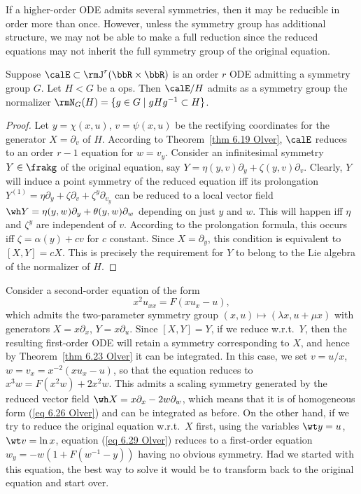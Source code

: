 If a higher-order ODE admits several symmetries, then it may be reducible in order more than once. However, unless the symmetry group has additional structure, we may not be able to make a full reduction since the reduced equations may not inherit the full symmetry group of the original equation.

\begin{thm}\label{thm 6.23 Olver}
    Suppose $\calE\subset\rmJ^r(\bbR\times\bbR)$ is an order $r$ ODE admitting a symmetry group $G$. Let $H<G$ be a \gls{ops}. Then $\calE\slash H$ admits as a symmetry group the normalizer $\rmN_G(H)=\{g\in G\mid gHg^{-1}\subset H\}$.
\end{thm}
\begin{proof}
    Let $y=\chi(x,u)$, $v=\psi(x,u)$ be the rectifying coordinates for the generator $X=\partial_v$ of $H$. According to Theorem~\ref{thm 6.19 Olver}, $\calE$ reduces to an order $r-1$ equation for $w=v_y$. Consider an infinitesimal symmetry $Y\in\frakg$ of the original equation, say $Y=\eta(y,v)\partial_y+\zeta(y,v)\partial_v$. Clearly, $Y$ will induce a point symmetry of the reduced equation iff its prolongation $Y^{(1)}=\eta\partial_y+\zeta\partial_v+\zeta^y\partial_{v_y}$ can be reduced to a local vector field $\wh Y=\eta(y,w)\partial_y+\theta(y,w)\partial_w$ depending on just $y$ and $w$. This will happen iff $\eta$ and $\zeta^y$ are independent of $v$. According to the prolongation formula, this occurs iff $\zeta=\alpha(y)+cv$ for $c$ constant. Since $X=\partial_y$, this condition is equivalent to $[X,Y]=cX$. This is precisely the requirement for $Y$ to belong to the Lie algebra of the normalizer of $H$.
\end{proof}

\begin{example}
    Consider a second-order equation of the form 
    \[x^2 u_{xx}=F(xu_x-u),\label{eq 6.29 Olver}\]
    which admits the two-parameter symmetry group $(x,u)\mapsto (\lambda x,u+\mu x)$ with generators $X=x\partial_x$, $Y=x\partial_u$. Since $[X,Y]=Y$, if we reduce w.r.t.\ $Y$, then the resulting first-order ODE will retain a symmetry corresponding to $X$, and hence by Theorem~\ref{thm 6.23 Olver} it can be integrated. In this case, we set $v=u/x$, $w=v_x=x^{-2}(xu_x-u)$, so that the equation reduces to $x^3w=F(x^2w)+2x^2w$. This admits a scaling symmetry generated by the reduced vector field $\wh X=x\partial_x-2w\partial_w$, which means that it is of homogeneous form (\ref{eq 6.26 Olver}) and can be integrated as before. On the other hand, if we try to reduce the original equation w.r.t.\ $X$ first, using the variables $\wt y=u$, $\wt v=\ln x$, equation (\ref{eq 6.29 Olver}) reduces to a first-order equation $w_y=-w(1+F(w^{-1}-y))$ having no obvious symmetry. Had we started with this equation, the best way to solve it would be to transform back to the original equation and start over.
\end{example}

